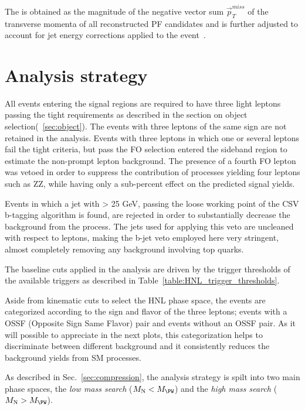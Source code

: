 
The \ptmiss is obtained as the magnitude of the negative vector sum $\overrightarrow{p}_{T}^{miss}$ of the transverse momenta of 
all reconstructed PF candidates and is further adjusted to account for jet energy corrections applied to the event~\cite{CMS-PAS-JME-16-004}.

\section{Analysis strategy}\label{sec:analisi}
All events entering the signal regions are required to have three light leptons passing the tight requirements as described in the section on object selection(~\ref{sec:object}).
The events with three leptons of the same sign are not retained in the analysis. 
Events with three leptons in which one or several leptons fail the tight criteria, but pass the FO selection entered the sideband region to estimate the non-prompt lepton background. The presence of a fourth FO lepton was vetoed in order to suppress the contribution of processes yielding four leptons such as ZZ, while having only a sub-percent effect on the predicted signal yields.

Events in which a jet with \pt > 25 GeV, passing the loose working point of the CSV b-tagging algorithm is found, are rejected in order to substantially decrease the background from the \ttbar process. The jets used for applying this veto are uncleaned with respect to leptons, making the b-jet veto employed here very stringent, almost completely removing any background involving top quarks. 

The baseline \pt cuts applied in the analysis are driven by the
trigger thresholds of the available triggers as described in
Table~\ref{table:HNL_trigger_thresholds}.

Aside from kinematic cuts to select the HNL phase space, the events
are categorized according to the sign and flavor of the three
leptons; events with a OSSF (Opposite Sign Same Flavor) pair and
events without an OSSF pair. As it will possible to appreciate in the
next plots, this categorization helps to discriminate between
different background and it consistently reduces the background yields
from SM processes.

As described in Sec.~\ref{sec:compression}, the analysis
strategy is spilt into two main phase spaces, the \emph{low mass search} ($M_\hnl <
M_\PW$) and the \emph{high mass search} ($M_\hnl > M_\PW$).

